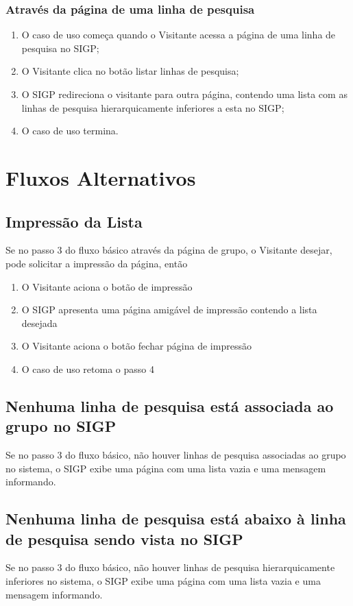 \documentclass[11pt, a4paper,oneside]{book}
\begin{document}
\subsubsection{Através da página de uma linha de pesquisa}
\begin{enumerate}
\item O caso de uso começa quando o Visitante acessa a página de uma linha de pesquisa no SIGP;
\item O Visitante clica no botão listar linhas de pesquisa;
\item O SIGP redireciona o visitante para outra página, contendo uma lista com as linhas de pesquisa hierarquicamente inferiores a esta no SIGP;
\item O caso de uso termina.
\end{enumerate}

\section{Fluxos Alternativos}

\subsection{Impressão da Lista}
Se no passo $3$ do fluxo básico através da página de grupo, o Visitante desejar, pode solicitar a impressão da página, então

\begin{enumerate}
\item O Visitante aciona o botão de impressão
\item O SIGP apresenta uma página amigável de impressão contendo a lista desejada
\item O Visitante aciona o botão fechar página de impressão
\item O caso de uso retoma o passo 4
\end{enumerate}

\subsection{Nenhuma linha de pesquisa está associada ao grupo no SIGP}
Se no passo $3$ do fluxo básico, não houver linhas de pesquisa associadas ao grupo no sistema, o SIGP exibe uma página com uma lista vazia e uma mensagem informando.

\subsection{Nenhuma linha de pesquisa está abaixo à linha de pesquisa sendo vista no SIGP}
Se no passo $3$ do fluxo básico, não houver linhas de pesquisa hierarquicamente inferiores no sistema, o SIGP exibe uma página com uma lista vazia e uma mensagem informando.
\end{document}
